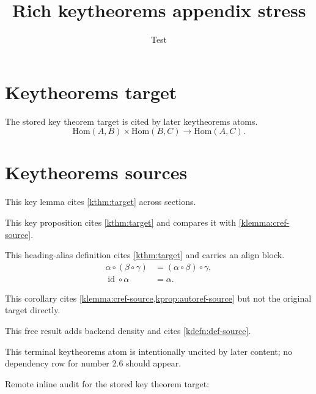 \documentclass{article}
\title{Rich keytheorems appendix stress}
\author{Test}
\date{}
\begin{document}
\START
\maketitle

\section{Keytheorems target}
\label{sec:key-app-target}

\begin{kthm}[store=storedmain]\label{kthm:target}
The stored key theorem target is cited by later keytheorems atoms.
\begin{equation}\label{eq:key-app-target}
  \mathrm{Hom}(A,B)\times\mathrm{Hom}(B,C)\to\mathrm{Hom}(A,C).
\end{equation}
\end{kthm}


\section{Keytheorems sources}
\label{sec:key-app-sources}

\begin{klemma}\label{klemma:cref-source}
This key lemma cites \cref{kthm:target} across sections.
\end{klemma}

\begin{kprop}\label{kprop:autoref-source}
This key proposition cites \autoref{kthm:target} and compares it with \cref{klemma:cref-source}.
\end{kprop}

\begin{kdefn}\label{kdefn:def-source}
This heading-alias definition cites \cref{kthm:target} and carries an align block.
\begin{align}
  \alpha\circ(\beta\circ\gamma) &= (\alpha\circ\beta)\circ\gamma,\\
  \operatorname{id}\circ\alpha &= \alpha.
\end{align}
\end{kdefn}

\begin{kcor}\label{kcor:cor-source}
This corollary cites \cref{klemma:cref-source,kprop:autoref-source} but not the original target directly.
\end{kcor}

\begin{kfree}\label{kfree:style-density}
This free result adds backend density and cites \cref{kdefn:def-source}.
\end{kfree}

\begin{kfree}\label{kfree:quiet}
This terminal keytheorems atom is intentionally uncited by later content; no dependency row for number 2.6 should appear.
\end{kfree}


\begingroup
{}
\noindent Remote inline audit for the stored key theorem target: 
\par
\endgroup
{}

\codepappendix
\END
\end{document}
